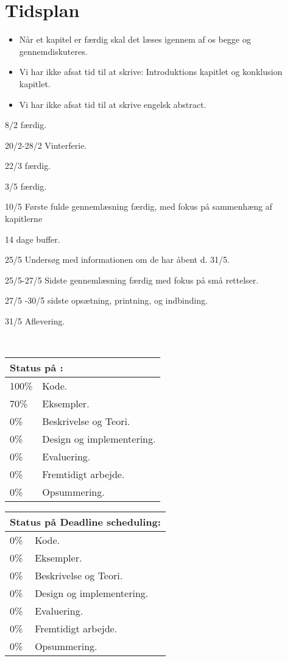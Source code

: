 \chapter{Tidsplan}

\begin{itemize}\tightlist
\item Når et kapitel er færdig skal det læses igennem af os begge og gennemdiskuteres.
\item Vi har ikke afsat tid til at skrive: Introduktions kapitlet og konklusion kapitlet.
\item Vi har ikke afsat tid til at skrive engelsk abstract.
\end{itemize}

\begin{list}{}{}
\tightlist 
\item [8/2] \des færdig.
\item [20/2-28/2] Vinterferie.
\item [22/3] \ds færdig.
\item [3/5] \is færdig.
\item [10/5] Første fulde gennemlæsning færdig, med fokus på sammenhæng af kapitlerne
\item [14 dage buffer.]
\item[25/5] Undersøg med informationen om de har åbent d. 31/5.
\item [25/5-27/5] Sidste gennemlæsning færdig med fokus på små rettelser.
\item [27/5 -30/5] sidste opsætning, printning, og indbinding.
\item [31/5] Aflevering. 
\end{list}\
\begin{tabular}{m{0.5cm}m{4cm}}
\hline  
\multicolumn{2}{m{4.5cm}}{\textbf{Status på \des:}} \\
\hline
100\% & Kode.  \\ 
70\% & Eksempler.\\
0\% & Beskrivelse og Teori.\\
0\% & Design og  implementering. \\
0\% & Evaluering. \\
0\% & Fremtidigt arbejde. \\
0\% & Opsummering. \\ 
\hline
\end{tabular}
\quad
\begin{tabular}{m{0.5cm}m{4cm}}
\hline  
\multicolumn{2}{m{4.5cm}}{\textbf{Status på Deadline scheduling:}} \\
\hline
0\% & Kode.  \\ 
0\% & Eksempler.\\
0\% & Beskrivelse og Teori.\\
0\% & Design og  implementering. \\
0\% & Evaluering. \\
0\% & Fremtidigt arbejde. \\
0\% & Opsummering. \\ 
\hline
\end{tabular}\\

